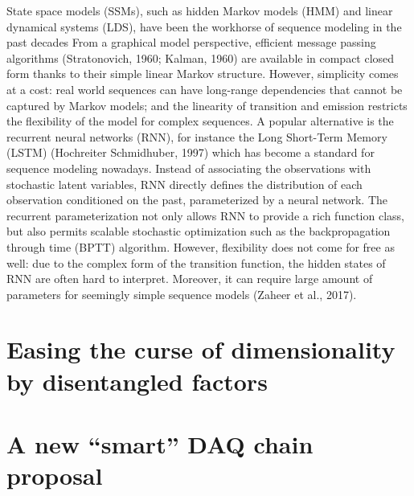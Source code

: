\cite{zheng2017state}
State space models (SSMs), such as hidden Markov models (HMM) and linear dynamical systems
(LDS), have been the workhorse of sequence modeling in the past decades From a graphical model
perspective, efficient message passing algorithms (Stratonovich, 1960; Kalman, 1960) are available
in compact closed form thanks to their simple linear Markov structure. However, simplicity comes
at a cost: real world sequences can have long-range dependencies that cannot be captured by Markov
models; and the linearity of transition and emission restricts the flexibility of the model for complex
sequences.
A popular alternative is the recurrent neural networks (RNN), for instance the Long Short-Term
Memory (LSTM) (Hochreiter  Schmidhuber, 1997) which has become a standard for sequence
modeling nowadays. Instead of associating the observations with stochastic latent variables, RNN
directly defines the distribution of each observation conditioned on the past, parameterized by a
neural network. The recurrent parameterization not only allows RNN to provide a rich function
class, but also permits scalable stochastic optimization such as the backpropagation through time
(BPTT) algorithm. However, flexibility does not come for free as well: due to the complex form of
the transition function, the hidden states of RNN are often hard to interpret. Moreover, it can require
large amount of parameters for seemingly simple sequence models (Zaheer et al., 2017).



\section{Easing the curse of dimensionality by disentangled factors}


\section{A new “smart” DAQ chain proposal}

